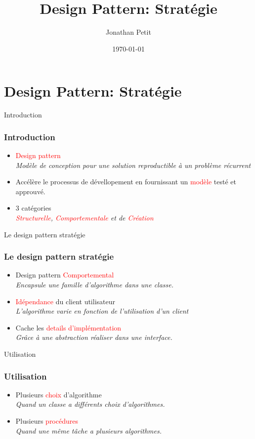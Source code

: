 \documentclass{beamer}
\title{Design Pattern: Strat\'egie}
\date{\today}
\author{Jonathan Petit}
\institute{ECAM - Architecture logicielle}
\begin{document}
  \maketitle

\section{Design Pattern: Strat\'egie}

  \begin{frame}{Introduction}
    \frametitle{Introduction}
    \begin{itemize}
      \item  \textcolor{red}{Design pattern} \\
      \textit{Mod\`ele de conception pour une solution reproductible à un probl\`eme r\'ecurrent}
      \item Accélère le processus de dévellopement en fournissant un \textcolor{red}{modèle} testé et approuvé. \\
      \item 3 catégories \\ \textit{\textcolor{red}{Structurelle}, \textcolor{red}{ Comportementale} et de  \textcolor{red}{Création}} 
    \end{itemize}
  \end{frame}

  \begin{frame}{Le design pattern stratégie}
    \frametitle{Le design pattern stratégie}
    \begin{itemize}
      \item Design pattern \textcolor{red}{Comportemental} \\
      \textit{Encapsule une famille d'algorithme dans une classe.}
      \item \textcolor{red}{Idépendance} du client utilisateur \\
      \textit{L'algorithme varie en fonction de l'utilisation d'un client}
      \item Cache les \textcolor{red}{details d'implémentation} \\
      \textit{Grâce à une abstraction réaliser dans une interface.}
    \end{itemize}
  \end{frame}
  
    \begin{frame}{Utilisation}
    \frametitle{Utilisation}
    \begin{itemize}
      \item Plusieurs \textcolor{red}{choix} d'algorithme  \\
      \textit{Quand un classe a différents choix d'algorithmes.}
      \item Plusieurs \textcolor{red}{procédures} \\
      \textit{Quand une même tâche a plusieurs algorithmes.}
    \end{itemize}
  \end{frame}
\end{document}
